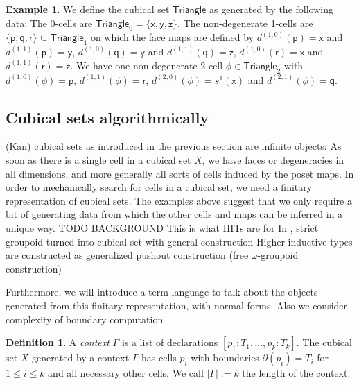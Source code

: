 \documentclass[11pt]{article}
\theoremstyle{definition}
\newtheorem{definition}{Definition}
\newtheorem{example}{Example}
\newcommand{\mdef}{:=}
\newcommand{\mname}[1]{\textit{{#1}}}
\newcommand{\mlist}[1]{[ {#1} ]}
\newcommand{\ctxtdim}[1]{|{#1}|}
\newcommand{\smap}[1]{s^{{#1}}}
\newcommand{\dmap}[2]{d^{({#1} , {#2})}}
\newcommand{\cset}[1]{\mathsf{{#1}}}
\newcommand{\boundary}[1]{\partial({#1})}
\begin{document}
\begin{example}\label{exp:triangle}
  We define the cubical set $\cset{Triangle}$ as generated by the following
  data: The 0-cells are $\cset{Triangle}_0 = \{ \cset{x} , \cset{y} , \cset{z}
  \}$. The non-degenerate 1-cells are $\{ \cset{p} ,
  \cset{q} , \cset{r} \} \subseteq \cset{Triangle}_1$ on which the face maps are defined by
    $\dmap{1}{0}(\cset{p}) = \cset{x}$ and $\dmap{1}{1}(\cset{p}) = \cset{y}$,
    $\dmap{1}{0}(\cset{q}) = \cset{y}$ and $\dmap{1}{1}(\cset{q}) = \cset{z}$,
    $\dmap{1}{0}(\cset{r}) = \cset{x}$ and $\dmap{1}{1}(\cset{r}) = \cset{z}$.
    We have one non-degenerate 2-cell $\cset{\phi} \in \cset{Triangle}_2$ with $\dmap{1}{0}(\cset{\phi}) =
    \cset{p}$, $\dmap{1}{1}(\cset{\phi}) = \cset{r}$, $\dmap{2}{0}(\cset{\phi})
    = \smap{1}(\cset{x})$ and $\dmap{2}{1}(\cset{\phi}) = \cset{q}$.
\end{example}






\subsection{Cubical sets algorithmically}

(Kan) cubical sets as introduced in the previous section are infinite objects:
As soon as there is a single cell in a cubical set $X$, we have faces or
degeneracies in all dimensions, and more generally all sorts of cells induced by
the poset maps. In order to mechanically search for cells in a cubical set, we
need a finitary representation of cubical sets. The examples above suggest that
we only require a bit of generating data from which the other cells and maps can
be inferred in a unique way. TODO BACKGROUND This is what HITs are for In
\cite[Sect. 6.4]{bezem14_model_type_theor_cubic_sets}, strict groupoid turned
into cubical set with general construction Higher inductive types are
constructed as generalized pushout construction (free $\omega$-groupoid
construction)

Furthermore, we will introduce a term language to talk about the objects
generated from this finitary representation, with normal forms. Also we consider
complexity of boundary computation 


\begin{definition}
  A \mname{context} $\Gamma$ is a list of declarations $\mlist{ p_1 : T_1 ,
    \ldots , p_k : T_k}$. The cubical set $X$ generated by a context $\Gamma$
  has cells $p_i$ with boundaries $\boundary{p_i} = T_i$ for $1 \leq i \leq k$
  and all necessary other cells. We call $\ctxtdim{\Gamma} \mdef k$ the length
  of the context.
\end{definition}
\end{document}
